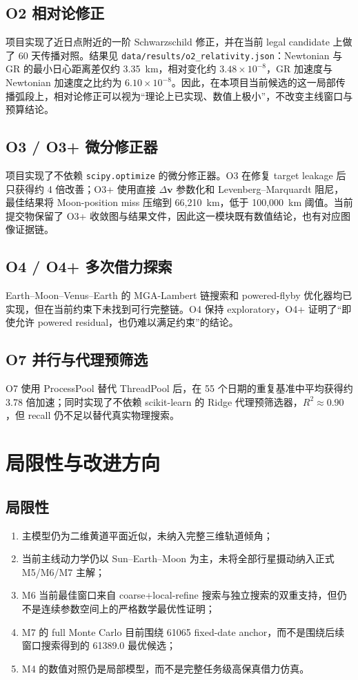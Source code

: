 \documentclass[12pt,a4paper]{ctexart}
\begin{document}
\subsection{O2 相对论修正}
项目实现了近日点附近的一阶 Schwarzschild 修正，并在当前 legal candidate 上做了 60 天传播对照。结果见 \texttt{data/results/o2\_relativity.json}：Newtonian 与 GR 的最小日心距离差仅约 3.35~km，相对变化约 $3.48\times10^{-8}$，GR 加速度与 Newtonian 加速度之比约为 $6.10\times10^{-8}$。因此，在本项目当前候选的这一局部传播弧段上，相对论修正可以视为“理论上已实现、数值上极小”，不改变主线窗口与预算结论。

\subsection{O3 / O3+ 微分修正器}
项目实现了不依赖 \texttt{scipy.optimize} 的微分修正器。O3 在修复 target leakage 后只获得约 4 倍改善；O3+ 使用直接 $\Delta \bm{v}$ 参数化和 Levenberg--Marquardt 阻尼，最佳结果将 Moon-position miss 压缩到 66,210~km，低于 100,000~km 阈值。当前提交物保留了 O3+ 收敛图与结果文件，因此这一模块既有数值结论，也有对应图像证据链。

\subsection{O4 / O4+ 多次借力探索}
Earth--Moon--Venus--Earth 的 MGA-Lambert 链搜索和 powered-flyby 优化器均已实现，但在当前约束下未找到可行完整链。O4 保持 exploratory，O4+ 证明了“即使允许 powered residual，也仍难以满足约束”的结论。

\subsection{O7 并行与代理预筛选}
O7 使用 ProcessPool 替代 ThreadPool 后，在 55 个日期的重复基准中平均获得约 3.78 倍加速；同时实现了不依赖 scikit-learn 的 Ridge 代理预筛选器，$R^2\approx 0.90$，但 recall 仍不足以替代真实物理搜索。

\newpage

\section{局限性与改进方向}
\subsection{局限性}
\begin{enumerate}
    \item 主模型仍为二维黄道平面近似，未纳入完整三维轨道倾角；
    \item 当前主线动力学仍以 Sun--Earth--Moon 为主，未将全部行星摄动纳入正式 M5/M6/M7 主解；
    \item M6 当前最佳窗口来自 coarse+local-refine 搜索与独立搜索的双重支持，但仍不是连续参数空间上的严格数学最优性证明；
    \item M7 的 full Monte Carlo 目前围绕 61065 fixed-date anchor，而不是围绕后续窗口搜索得到的 61389.0 最优候选；
    \item M4 的数值对照仍是局部模型，而不是完整任务级高保真借力仿真。
\end{enumerate}
\end{document}
